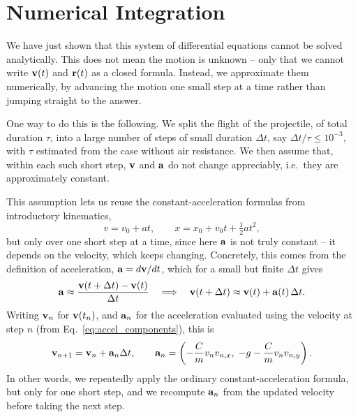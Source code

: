 \documentclass[11pt]{article}
\begin{document}
\section{Numerical Integration}

We have just shown that this system of differential equations cannot
be solved analytically. This does not mean the motion is unknown --
only that we cannot write $\vb{v}(t)$ and $\vb{r}(t)$ as a closed
formula. Instead, we approximate them numerically, by advancing the
motion one small step at a time rather than jumping straight to the
answer.

One way to do this is the following. We split the flight of the
projectile, of total duration $\tau$, into a large number of steps of
small duration $\Delta t$, say $\Delta t/\tau \leq 10^{-3}$, with
$\tau$ estimated from the case without air resistance. We then assume
that, within each such short step, $\vb{v}$ and $\vb{a}$ do not change
appreciably, i.e.\ they are approximately constant.

This assumption lets us reuse the constant-acceleration formulas from
introductory kinematics,
\begin{equation}
    v = v_0 + at, \qquad x = x_0 + v_0 t + \tfrac{1}{2}at^2,
    \label{eq:kinematics}
\end{equation}
but only over one short step at a time, since here $\vb{a}$ is not
truly constant -- it depends on the velocity, which keeps changing.
Concretely, this comes from the definition of acceleration,
$\vb{a} = d\vb{v}/dt$, which for a small but finite $\Delta t$ gives
\begin{equation}
    \vb{a} \approx \frac{\vb{v}(t+\Delta t) - \vb{v}(t)}{\Delta t}
    \quad \Longrightarrow \quad
    \vb{v}(t+\Delta t) \approx \vb{v}(t) + \vb{a}(t)\,\Delta t.
\end{equation}
Writing $\vb{v}_n$ for $\vb{v}(t_n)$, and $\vb{a}_n$ for the
acceleration evaluated using the velocity at step $n$ (from
Eq.~\eqref{eq:accel_components}), this is
\begin{equation}
    \vb{v}_{n+1} = \vb{v}_n + \vb{a}_n \Delta t, \qquad
    \vb{a}_n = \left(-\frac{C}{m}v_n v_{n,x},\; -g-\frac{C}{m}v_n
    v_{n,y}\right).
\end{equation}
In other words, we repeatedly apply the ordinary constant-acceleration
formula, but only for one short step, and we recompute $\vb{a}_n$ from
the updated velocity before taking the next step.
\end{document}
